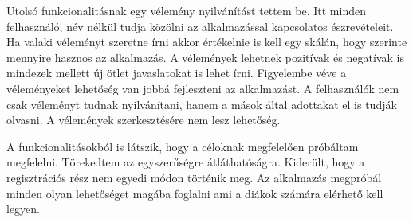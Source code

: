 Utolsó funkcionalitásnak egy vélemény nyilvánítást tettem be. Itt minden felhasználó, név nélkül tudja közölni az alkalmazással kapcsolatos észrevételeit. Ha valaki véleményt szeretne írni akkor értékelnie is kell egy skálán, hogy szerinte mennyire hasznos az alkalmazás. A vélemények lehetnek pozitívak és negatívak is mindezek mellett új ötlet javaslatokat is lehet írni. Figyelembe véve a véleményeket lehetőség van jobbá fejleszteni az alkalmazást. A felhasználók nem csak véleményt tudnak nyilvánítani, hanem a mások által adottakat el is tudják olvasni. A vélemények szerkesztésére nem lesz lehetőség.

A funkcionalitásokból is látszik, hogy a céloknak megfelelően próbáltam megfelelni. Törekedtem az egyszerűségre átláthatóságra. Kiderült, hogy a regisztrációs rész nem egyedi módon történik meg. Az alkalmazás megpróbál minden olyan lehetőséget magába foglalni ami a diákok számára elérhető kell legyen.